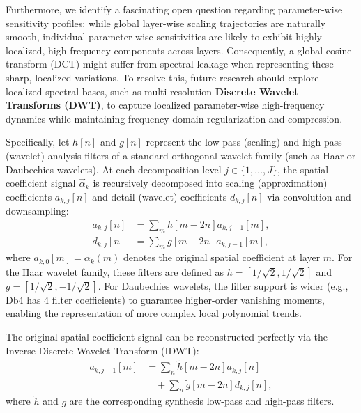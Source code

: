 \begin{itemize}
    Furthermore, we identify a fascinating open question regarding parameter-wise sensitivity profiles: while global layer-wise scaling trajectories are naturally smooth, individual parameter-wise sensitivities are likely to exhibit highly localized, high-frequency components across layers. Consequently, a global cosine transform (DCT) might suffer from spectral leakage when representing these sharp, localized variations. To resolve this, future research should explore localized spectral bases, such as multi-resolution \textbf{Discrete Wavelet Transforms (DWT)}, to capture localized parameter-wise high-frequency dynamics while maintaining frequency-domain regularization and compression. 

    Specifically, let $h[n]$ and $g[n]$ represent the low-pass (scaling) and high-pass (wavelet) analysis filters of a standard orthogonal wavelet family (such as Haar or Daubechies wavelets). At each decomposition level $j \in \{1, \dots, J\}$, the spatial coefficient signal $\vec{\alpha}_k$ is recursively decomposed into scaling (approximation) coefficients $a_{k, j}[n]$ and detail (wavelet) coefficients $d_{k, j}[n]$ via convolution and downsampling:
    \begin{align}
        a_{k, j}[n] &= \sum_{m} h[m - 2n] a_{k, j-1}[m], \\
        d_{k, j}[n] &= \sum_{m} g[m - 2n] a_{k, j-1}[m],
    \end{align}
    where $a_{k,0}[m] = \alpha_k(m)$ denotes the original spatial coefficient at layer $m$. For the Haar wavelet family, these filters are defined as $h = [1/\sqrt{2}, 1/\sqrt{2}]$ and $g = [1/\sqrt{2}, -1/\sqrt{2}]$. For Daubechies wavelets, the filter support is wider (e.g., Db4 has 4 filter coefficients) to guarantee higher-order vanishing moments, enabling the representation of more complex local polynomial trends. 

    The original spatial coefficient signal can be reconstructed perfectly via the Inverse Discrete Wavelet Transform (IDWT):
    \begin{align}
        a_{k, j-1}[m] &= \sum_{n} \tilde{h}[m - 2n] a_{k,j}[n] \nonumber \\
        &\quad + \sum_{n} \tilde{g}[m - 2n] d_{k,j}[n],
    \end{align}
    where $\tilde{h}$ and $\tilde{g}$ are the corresponding synthesis low-pass and high-pass filters. 


\end{itemize}
